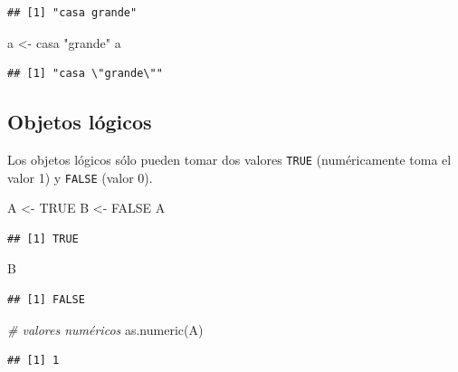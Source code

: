 \documentclass[
]{book}
\newenvironment{Shaded}{\begin{snugshade}}{\end{snugshade}}
\newcommand{\CommentTok}[1]{\textcolor[rgb]{0.56,0.35,0.01}{\textit{#1}}}
\newcommand{\ConstantTok}[1]{\textcolor[rgb]{0.00,0.00,0.00}{#1}}
\newcommand{\FunctionTok}[1]{\textcolor[rgb]{0.00,0.00,0.00}{#1}}
\newcommand{\NormalTok}[1]{#1}
\newcommand{\OtherTok}[1]{\textcolor[rgb]{0.56,0.35,0.01}{#1}}
\newcommand{\StringTok}[1]{\textcolor[rgb]{0.31,0.60,0.02}{#1}}
\theoremstyle{break}
\theoremstyle{nonumberplain}
\begin{document}
\begin{verbatim}
## [1] "casa grande"
\end{verbatim}

\begin{Shaded}
\begin{Highlighting}[]
\NormalTok{a }\OtherTok{\textless{}{-}} \StringTok{\textquotesingle{}casa "grande"\textquotesingle{}}
\NormalTok{a}
\end{Highlighting}
\end{Shaded}

\begin{verbatim}
## [1] "casa \"grande\""
\end{verbatim}

\hypertarget{objetos-luxf3gicos}{%
\subsection{Objetos lógicos}\label{objetos-luxf3gicos}}

Los objetos lógicos sólo pueden
tomar dos valores \texttt{TRUE} (numéricamente toma el valor 1) y \texttt{FALSE}
(valor 0).

\begin{Shaded}
\begin{Highlighting}[]
\NormalTok{A }\OtherTok{\textless{}{-}} \ConstantTok{TRUE}
\NormalTok{B }\OtherTok{\textless{}{-}} \ConstantTok{FALSE}
\NormalTok{A}
\end{Highlighting}
\end{Shaded}

\begin{verbatim}
## [1] TRUE
\end{verbatim}

\begin{Shaded}
\begin{Highlighting}[]
\NormalTok{B}
\end{Highlighting}
\end{Shaded}

\begin{verbatim}
## [1] FALSE
\end{verbatim}

\begin{Shaded}
\begin{Highlighting}[]
\CommentTok{\# valores numéricos}
\FunctionTok{as.numeric}\NormalTok{(A)}
\end{Highlighting}
\end{Shaded}

\begin{verbatim}
## [1] 1
\end{verbatim}
\end{document}
